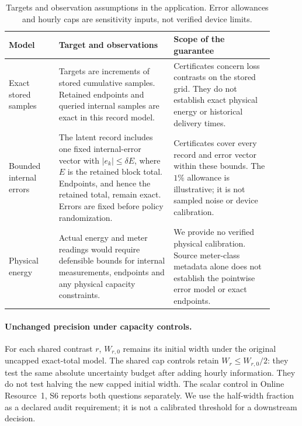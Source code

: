 \documentclass[12pt]{article}
\begin{document}
\begin{table}[htbp]
\centering\small
\caption{Targets and observation assumptions in the application. Error
allowances and hourly caps are sensitivity inputs, not verified device limits.}
\label{tab:measurement-assumptions}
\begin{tabular}{>{\raggedright\arraybackslash}p{0.17\linewidth}>{\raggedright\arraybackslash}p{0.39\linewidth}>{\raggedright\arraybackslash}p{0.34\linewidth}}
\toprule
Model & Target and observations & Scope of the guarantee\\
\midrule
Exact stored samples
& Targets are increments of stored cumulative samples. Retained endpoints
and queried internal samples are exact in this record model.
& Certificates concern loss contrasts on the stored grid. They do not
establish exact physical energy or historical delivery times.\\
Bounded internal errors
& The latent record includes one fixed internal-error vector with
$|e_k|\leq\delta E$, where $E$ is the retained block total. Endpoints, and hence the
retained total, remain exact. Errors are fixed before policy randomization.
& Certificates cover every record and error vector within these bounds.
The $1\%$ allowance is illustrative; it is not sampled noise or device calibration.\\
Physical energy
& Actual energy and meter readings would require defensible bounds for
internal measurements, endpoints and any physical capacity constraints.
& We provide no verified physical calibration. Source meter-class metadata
alone does not establish the pointwise error model or exact endpoints.\\
\bottomrule
\end{tabular}
\end{table}

\paragraph{Unchanged precision under capacity controls.}
For each shared contrast $r$, $W_{r,0}$ remains its initial width under the
original uncapped exact-total model. The shared cap controls retain
$W_r\leq W_{r,0}/2$: they test the same absolute uncertainty budget after
adding hourly information. They do not test halving the new capped initial
width. The scalar control in Online Resource~1, S6 reports both
questions separately. We use the half-width fraction as a declared audit
requirement; it is not a calibrated threshold for a downstream decision.
\end{document}
